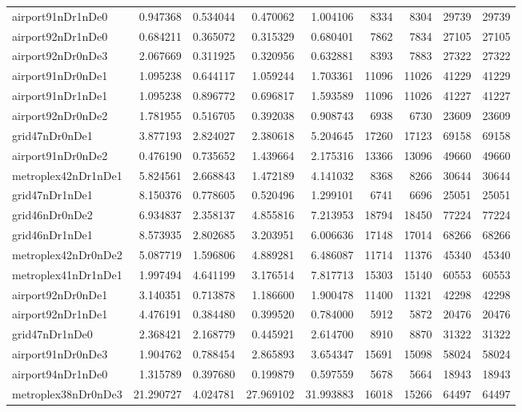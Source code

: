 \begin{longtable}{|l|r|r|r|r|r|r|r|r|}
airport91nDr1nDe0 & 0.947368 & 0.534044 & 0.470062 & 1.004106 & 8334 & 8304 & 29739 & 29739 \\
airport92nDr1nDe0 & 0.684211 & 0.365072 & 0.315329 & 0.680401 & 7862 & 7834 & 27105 & 27105 \\
airport92nDr0nDe3 & 2.067669 & 0.311925 & 0.320956 & 0.632881 & 8393 & 7883 & 27322 & 27322 \\
airport91nDr0nDe1 & 1.095238 & 0.644117 & 1.059244 & 1.703361 & 11096 & 11026 & 41229 & 41229 \\
airport91nDr1nDe1 & 1.095238 & 0.896772 & 0.696817 & 1.593589 & 11096 & 11026 & 41227 & 41227 \\
airport92nDr0nDe2 & 1.781955 & 0.516705 & 0.392038 & 0.908743 & 6938 & 6730 & 23609 & 23609 \\
grid47nDr0nDe1 & 3.877193 & 2.824027 & 2.380618 & 5.204645 & 17260 & 17123 & 69158 & 69158 \\
airport91nDr0nDe2 & 0.476190 & 0.735652 & 1.439664 & 2.175316 & 13366 & 13096 & 49660 & 49660 \\
metroplex42nDr1nDe1 & 5.824561 & 2.668843 & 1.472189 & 4.141032 & 8368 & 8266 & 30644 & 30644 \\
grid47nDr1nDe1 & 8.150376 & 0.778605 & 0.520496 & 1.299101 & 6741 & 6696 & 25051 & 25051 \\
grid46nDr0nDe2 & 6.934837 & 2.358137 & 4.855816 & 7.213953 & 18794 & 18450 & 77224 & 77224 \\
grid46nDr1nDe1 & 8.573935 & 2.802685 & 3.203951 & 6.006636 & 17148 & 17014 & 68266 & 68266 \\
metroplex42nDr0nDe2 & 5.087719 & 1.596806 & 4.889281 & 6.486087 & 11714 & 11376 & 45340 & 45340 \\
metroplex41nDr1nDe1 & 1.997494 & 4.641199 & 3.176514 & 7.817713 & 15303 & 15140 & 60553 & 60553 \\
airport92nDr0nDe1 & 3.140351 & 0.713878 & 1.186600 & 1.900478 & 11400 & 11321 & 42298 & 42298 \\
airport92nDr1nDe1 & 4.476191 & 0.384480 & 0.399520 & 0.784000 & 5912 & 5872 & 20476 & 20476 \\
grid47nDr1nDe0 & 2.368421 & 2.168779 & 0.445921 & 2.614700 & 8910 & 8870 & 31322 & 31322 \\
airport91nDr0nDe3 & 1.904762 & 0.788454 & 2.865893 & 3.654347 & 15691 & 15098 & 58024 & 58024 \\
airport94nDr1nDe0 & 1.315789 & 0.397680 & 0.199879 & 0.597559 & 5678 & 5664 & 18943 & 18943 \\
metroplex38nDr0nDe3 & 21.290727 & 4.024781 & 27.969102 & 31.993883 & 16018 & 15266 & 64497 & 64497 \\

\end{longtable}
